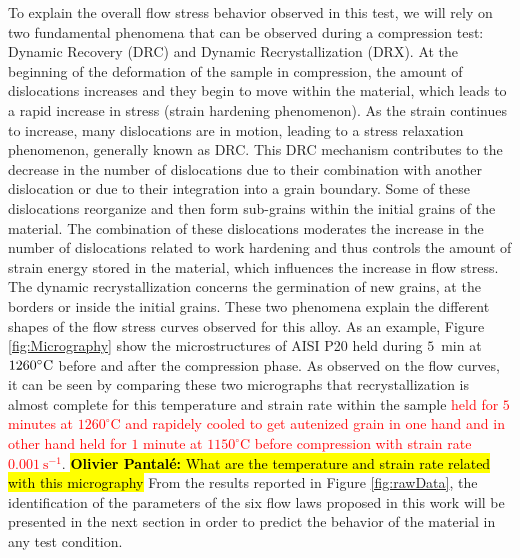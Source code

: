 \documentclass[twoside,english,1p,final,sort&compress]{elsarticle}
\theoremstyle{plain}
\DeclareRobustCommand{\OP}[1]{ {\begingroup\sethlcolor{VWyellow}\textcolor{red}{\hl{\textbf{Olivier Pantal\'e:} #1}}\endgroup} }
\begin{document}
To explain the overall flow stress behavior observed in this test, we will rely on two fundamental phenomena that can be observed during a compression test: Dynamic Recovery (DRC) and Dynamic Recrystallization (DRX).
At the beginning of the deformation of the sample in compression, the amount of dislocations increases and they begin to move within the material, which leads to a rapid increase in stress (strain hardening phenomenon).
As the strain continues to increase, many dislocations are in motion, leading to a stress relaxation phenomenon, generally known as DRC.
This DRC mechanism contributes to the decrease in the number of dislocations due to their combination with another dislocation or due to their integration into a grain boundary.
Some of these dislocations reorganize and then form sub-grains within the initial grains of the material.
The combination of these dislocations moderates the increase in the number of dislocations related to work hardening and thus controls the amount of strain energy stored in the material, which influences the increase in flow stress.
The dynamic recrystallization concerns the germination of new grains, at the borders or inside the initial grains.
These two phenomena explain the different shapes of the flow stress curves observed for this alloy.
As an example, Figure \ref{fig:Micrography} show the microstructures of AISI P20 held during $5$~min at $1260\celsius$ before and after the compression phase.
As observed on the flow curves, it can be seen by comparing these two micrographs that recrystallization is almost complete for this temperature and strain rate within the sample \textcolor{red}{held for $5$ minutes at $1260^\circ$C and rapidely cooled to get autenized grain in one hand and in other hand held for $1$ minute at $1150^\circ$C before compression with strain rate $0.001\ \text{s}^{-1}$}.
\OP{What are the temperature and strain rate related with this micrography}
From the results reported in Figure \ref{fig:rawData}, the identification of the parameters of the six flow laws proposed in this work will be presented in the next section in order to predict the behavior of the material in any test condition.
\end{document}
